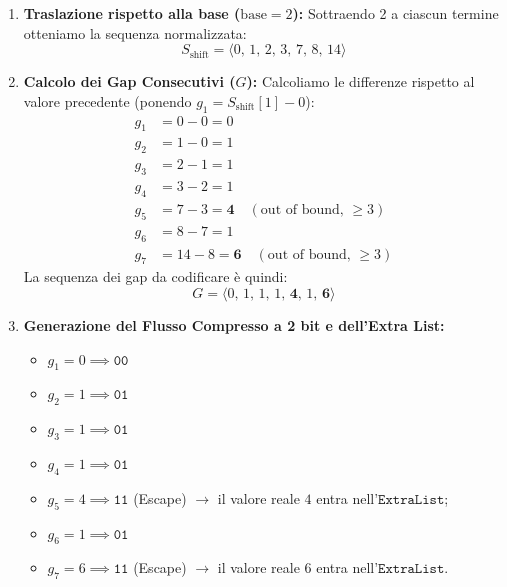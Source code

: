 \begin{enumerate}
  \item \textbf{Traslazione rispetto alla base ($\text{base} = 2$):}
  Sottraendo 2 a ciascun termine otteniamo la sequenza normalizzata:
  \begin{equation*}
    S_{\text{shift}} = \langle 0, \, 1, \, 2, \, 3, \, 7, \, 8, \, 14 \rangle
  \end{equation*}

  \item \textbf{Calcolo dei Gap Consecutivi ($G$):}
  Calcoliamo le differenze rispetto al valore precedente (ponendo $g_1 = S_{\text{shift}}[1] - 0$):
  \begin{align*}
    g_1 &= 0 - 0 = 0 \\
    g_2 &= 1 - 0 = 1 \\
    g_3 &= 2 - 1 = 1 \\
    g_4 &= 3 - 2 = 1 \\
    g_5 &= 7 - 3 = \mathbf{4} \quad (\text{out of bound, } \ge 3) \\
    g_6 &= 8 - 7 = 1 \\
    g_7 &= 14 - 8 = \mathbf{6} \quad (\text{out of bound, } \ge 3)
  \end{align*}
  La sequenza dei gap da codificare \`e quindi:
  \begin{equation*}
    G = \langle 0, \, 1, \, 1, \, 1, \, \mathbf{4}, \, 1, \, \mathbf{6} \rangle
  \end{equation*}

  \item \textbf{Generazione del Flusso Compresso a 2 bit e dell'Extra List:}
  \begin{itemize}
    \item $g_1 = 0 \implies \texttt{00}$
    \item $g_2 = 1 \implies \texttt{01}$
    \item $g_3 = 1 \implies \texttt{01}$
    \item $g_4 = 1 \implies \texttt{01}$
    \item $g_5 = 4 \implies \texttt{11}$ (Escape) $\longrightarrow$ il valore reale $4$ entra nell'$\texttt{ExtraList}$;
    \item $g_6 = 1 \implies \texttt{01}$
    \item $g_7 = 6 \implies \texttt{11}$ (Escape) $\longrightarrow$ il valore reale $6$ entra nell'$\texttt{ExtraList}$.
  \end{itemize}
\end{enumerate}

